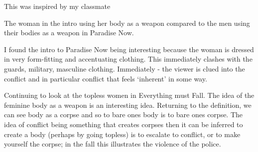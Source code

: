 \documentclass{article}
\begin{document}
This was inspired by my classmate 

The woman in the intro using her body as a weapon compared to the men using their bodies as a weapon in Paradise Now. 

I found the intro to Paradise Now being interesting because the woman is dressed in very form-fitting and accentuating clothing. This immediately clashes with the guards, military, masculine clothing. Immediately - the viewer is clued into the conflict and in particular conflict that feels `inherent' in some way.  

Continuing to look at the topless women in Everything must Fall. The idea of the feminine body as a weapon is an interesting idea. Returning to the definition, we can see body as a corpse and so to bare ones body is to bare ones corpse. The idea of conflict being something that creates corpses then it can be inferred to create a body (perhaps by going topless) is to escalate to conflict, or to make yourself the corpse; in the fall this illustrates the violence of the police. 
\end{document}
